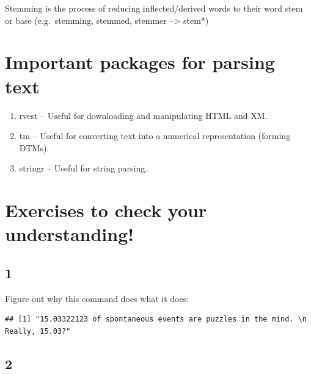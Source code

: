 \documentclass[]{book}
\newenvironment{Shaded}{\begin{snugshade}}{\end{snugshade}}
\newcommand{\KeywordTok}[1]{\textcolor[rgb]{0.13,0.29,0.53}{\textbf{#1}}}
\newcommand{\FloatTok}[1]{\textcolor[rgb]{0.00,0.00,0.81}{#1}}
\newcommand{\StringTok}[1]{\textcolor[rgb]{0.31,0.60,0.02}{#1}}
\newcommand{\NormalTok}[1]{#1}
\providecommand{\tightlist}{%
  \setlength{\itemsep}{0pt}\setlength{\parskip}{0pt}}
\theoremstyle{definition}
\theoremstyle{definition}
\theoremstyle{definition}
\theoremstyle{remark}
\begin{document}
Stemming is the process of reducing inflected/derived words to their
word stem or base (e.g.~stemming, stemmed, stemmer --\textgreater{}
stem*)

\section{Important packages for parsing
text}\label{important-packages-for-parsing-text}

\begin{enumerate}
\def\labelenumi{\arabic{enumi}.}
\tightlist
\item
  rvest -- Useful for downloading and manipulating HTML and XM.
\item
  tm -- Useful for converting text into a numerical representation
  (forming DTMs).
\item
  stringr -- Useful for string parsing.
\end{enumerate}

\section{Exercises to check your
understanding!}\label{exercises-to-check-your-understanding}

\subsection{1}\label{section}

Figure out why this command does what it does:

\begin{Shaded}
\end{Shaded}

\begin{verbatim}
## [1] "15.03322123 of spontaneous events are puzzles in the mind. \n        Really, 15.03?"
\end{verbatim}

\subsection{2}\label{section-1}
\end{document}

